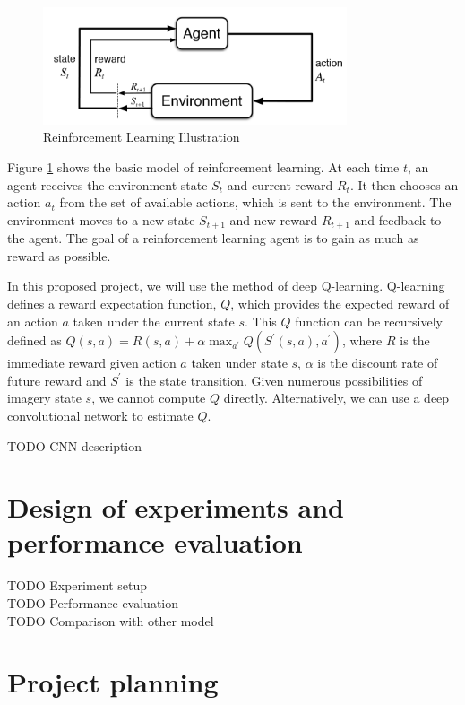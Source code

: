 \documentclass[a4paper]{article}
\begin{document}
\begin{figure}
    \centering
    \includegraphics[width=0.8\textwidth]{./figures/rl.png}
    \caption{ Reinforcement Learning Illustration}
    \label{fig:RL}
\end{figure}


Figure \ref{fig:RL} shows the basic model of reinforcement learning. At each time $t$, an agent
receives the environment state $S_t$ and current reward $R_t$. It then chooses an action $a_t$
from the set of available actions, which is sent to the environment. The environment moves
to a new state $S_{t+1}$ and new reward $R_{t+1}$ and feedback to the agent. The goal of a
reinforcement learning agent is to gain as much as reward as possible.


In this proposed project, we will use the method of deep Q-learning. Q-learning defines a reward
expectation function, $Q$, which provides the expected reward of an action $a$ taken under the
current state $s$. This $Q$ function can be recursively defined as $Q(s,a) = R(s,a) + \alpha
\max_{a^{'}} Q(S^{'}(s,a),a^{'})$, where $R$ is the immediate reward given action $a$ taken under
state $s$, $\alpha$ is the discount rate of future reward and $S^{'}$ is the state transition.
Given numerous possibilities of imagery state $s$, we cannot compute $Q$ directly. Alternatively,
we can use a deep convolutional network to estimate $Q$.

TODO CNN description\\

\section{Design of experiments and performance evaluation}

TODO Experiment setup\\
TODO Performance evaluation\\
TODO Comparison with other model\\

\section {Project planning}
\end{document}
